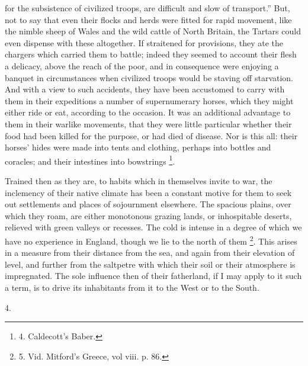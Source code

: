 for the subsistence of civilized troops, are difficult and slow of
transport.'' But, not to say that even their flocks and herds were
fitted for rapid movement, like the nimble sheep of Wales and the wild
cattle of North Britain, the Tartars could even dispense with these
altogether. If straitened for provisions, they ate the chargers which
carried them to battle; indeed they seemed to account their flesh a
delicacy, above the reach of the poor, and in consequence were
enjoying a banquet in circumstances when civilized troops would be
staving off starvation. And with a view to such accidents, they have
been accustomed to carry with them in their expeditions a number of
supernumerary horses, which they might either ride or eat, according
to the occasion. It was an additional advantage to them in their
warlike movements, that they were little particular whether their food
had been killed for the purpose, or had died of disease. Nor is this
all: their horses' hides were made into tents and clothing, perhaps
into bottles and coracles; and their intestines into bowstrings \footnote{4.
Caldecott's Baber.}.

Trained then as they are, to
habits which in themselves invite to war, the inclemency of their
native climate has been a constant motive for them to seek out
settlements and places of sojournment elsewhere. The spacious plains,
over which they roam, are either monotonous grazing lands, or
inhospitable deserts, relieved with green valleys or recesses. The
cold is intense in a degree of which we have no experience in England,
though we lie to the north of them \footnote{5.
Vid. Mitford's Greece, vol viii. p. 86.}. This arises in a measure from their distance from the sea, and
again from their elevation of level, and further from the saltpetre
with which their soil or their atmosphere is impregnated. The sole
influence then of their fatherland, if I may apply to it such a term,
is to drive its inhabitants from it to the West or to the South.

4.

